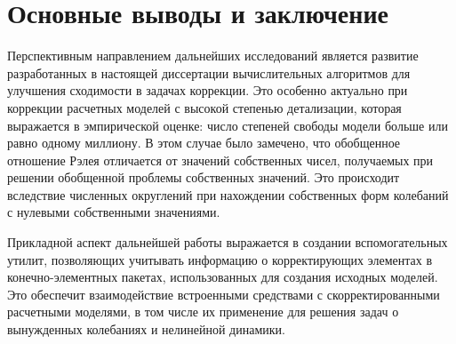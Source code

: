
\chapter*{Основные выводы и заключение} 

Перспективным направлением дальнейших исследований является развитие разработанных в настоящей диссертации вычислительных алгоритмов для улучшения сходимости в задачах коррекции. Это особенно актуально при коррекции расчетных моделей с высокой степенью детализации, которая выражается в эмпирической оценке: число степеней свободы модели больше или равно одному миллиону. В этом случае было замечено, что обобщенное отношение Рэлея отличается от значений собственных чисел, получаемых при решении обобщенной проблемы собственных значений. Это происходит вследствие численных округлений при нахождении собственных форм колебаний с нулевыми собственными значениями.

Прикладной аспект дальнейшей работы выражается в создании вспомогательных утилит, позволяющих учитывать информацию о корректирующих элементах в конечно-элементных пакетах, использованных для создания исходных моделей. Это обеспечит взаимодействие встроенными средствами с скорректированными расчетными моделями, в том числе их применение для решения задач о вынужденных колебаниях и нелинейной динамики.
